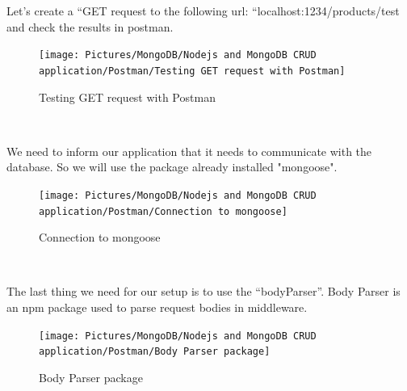 \begin{spacing}{1.2}
\par Let's create a “GET request to the following url: “localhost:1234/products/test and check the results in postman.
\begin{figure}[!htb] 
\begin{center} 
\texttt{[image: Pictures/MongoDB/Nodejs and MongoDB CRUD  application/Postman/Testing GET request with Postman]} 
\end{center} 
\caption{Testing GET request with Postman} 
\end{figure}  \FloatBarrier
\\

\par We need to inform our application that it needs to communicate with the database. So we will use the package already installed "mongoose".
\\
\begin{figure}[!htb] 
\begin{center} 
\texttt{[image: Pictures/MongoDB/Nodejs and MongoDB CRUD  application/Postman/Connection to mongoose]} 
\end{center} 
\caption{Connection to mongoose} 
\end{figure}  \FloatBarrier
\\

\par The last thing we need for our setup is to use the “bodyParser”.
Body Parser is an npm package used to parse request bodies in middleware.
\\
\begin{figure}[!htb] 
\begin{center} 
\texttt{[image: Pictures/MongoDB/Nodejs and MongoDB CRUD  application/Postman/Body Parser package]} 
\end{center} 
\caption{Body Parser package} 
\end{figure}  \FloatBarrier
\\

\newpage

\end{spacing}
